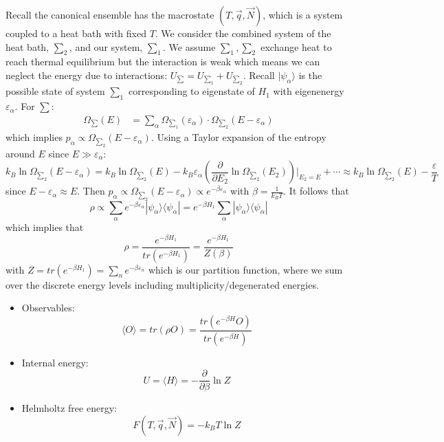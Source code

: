 \documentclass[12pt, a4paper, oneside, openright, titlepage]{book}
\begin{document}
Recall the canonical ensemble has the macrostate $(T,\vec{q},\vec{N})$, which is a system coupled to a heat bath with fixed $T$. We consider the combined system of the heat bath, $\sum_2$, and our system, $\sum_1$. We assume $\sum_1,\sum_2$ exchange heat to reach thermal equilibrium but the interaction is weak which means we can neglect the energy due to interactions: $U_{\sum} = U_{\sum_1} + U_{\sum_2}$. Recall $|\psi_{\alpha}\rangle$ is the possible state of system $\sum_1$ corresponding to eigenstate of $H_1$ with eigenenergy $\varepsilon_{\alpha}$. For $\sum$: \begin{align*}
    \Omega_{\sum}(E) &= \sum_{\alpha}\Omega_{\sum_1}(\varepsilon_{\alpha})\cdot \Omega_{\sum_2}(E-\varepsilon_{\alpha})
\end{align*}
which implies $p_{\alpha} \propto \Omega_{\sum_2}(E-\varepsilon_{\alpha})$. Using a Taylor expansion of the entropy around $E$ since $E \gg \varepsilon_{\alpha}$: \begin{equation*}
    k_B\ln\Omega_{\sum_2}(E-\varepsilon_{\alpha}) = k_B\ln\Omega_{\sum_2}(E) - k_B\varepsilon_{\alpha}\left(\frac{\partial }{\partial E_2}\ln\Omega_{\sum_2}(E_2)\right)\Bigg\rvert_{E_2 = E}+\cdots \approx k_B\ln\Omega_{\sum_2}(E) - \frac{\varepsilon}{T}
\end{equation*}
since $E-\varepsilon_{\alpha}\approx E$. Then $p_{\alpha}\propto\Omega_{\sum_2}(E-\varepsilon_{\alpha})\propto e^{-\beta\varepsilon_{\alpha}}$ with $\beta = \frac{1}{k_BT}$. It follows that \begin{equation*}
    \rho\propto \sum_{\alpha}e^{-\beta\varepsilon_{\alpha}}|\psi_{\alpha}\rangle\langle\psi_{\alpha}| = e^{-\beta H_1}\sum_{\alpha}|\psi_{\alpha}\rangle\langle\psi_{\alpha}|
\end{equation*}
which implies that \begin{equation*}
    \rho = \frac{e^{-\beta H_1}}{tr(e^{-\beta H_1})} = \frac{e^{-\beta H_1}}{Z(\beta)}
\end{equation*}
with $Z = tr(e^{-\beta H_1}) = \sum_ne^{-\beta\varepsilon_n}$ which is our partition function, where we sum over the discrete energy levels including multiplicity/degenerated energies. 

\begin{itemize}
    \item Observables: \begin{equation*}
            \langle O\rangle = tr(\rho O) = \frac{tr(e^{-\beta H}O)}{tr(e^{-\beta H})} 
        \end{equation*}
    \item Internal energy: \begin{equation*}
            U = \langle H\rangle = -\frac{\partial }{\partial \beta}\ln Z
        \end{equation*}
    \item Helmholtz free energy: \begin{equation*}
            F(T,\vec{q},\vec{N}) = -k_BT\ln Z
    \end{equation*}
\end{itemize}
\end{document}
